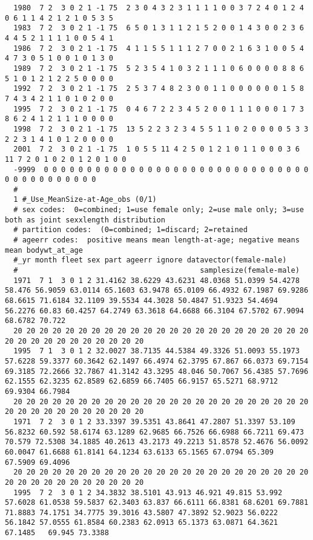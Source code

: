 \begin{landscape}
{\begin{verbatim}
  1980  7 2  3 0 2 1 -1 75  2 3 0 4 3 2 3 1 1 1 1 0 0 3 7 2 4 0 1 2 4 0 6 1 1 4 2 1 2 1 0 5 3 5
  1983  7 2  3 0 2 1 -1 75  6 5 0 1 3 1 1 2 1 5 2 0 0 1 4 3 0 0 2 3 6 4 4 5 2 1 1 1 1 0 0 5 4 1
  1986  7 2  3 0 2 1 -1 75  4 1 1 5 5 1 1 1 2 7 0 0 2 1 6 3 1 0 0 5 4 4 7 3 0 5 1 0 0 1 0 1 3 0
  1989  7 2  3 0 2 1 -1 75  5 2 3 5 4 1 0 3 2 1 1 1 0 6 0 0 0 0 8 8 6 5 1 0 1 2 1 2 2 5 0 0 0 0
  1992  7 2  3 0 2 1 -1 75  2 5 3 7 4 8 2 3 0 0 1 1 0 0 0 0 0 0 1 5 8 7 4 3 4 2 1 1 0 1 0 2 0 0
  1995  7 2  3 0 2 1 -1 75  0 4 6 7 2 2 3 4 5 2 0 0 1 1 1 0 0 0 1 7 3 8 6 2 4 1 2 1 1 1 0 0 0 0
  1998  7 2  3 0 2 1 -1 75  13 5 2 2 3 2 3 4 5 5 1 1 0 2 0 0 0 0 5 3 3 2 2 3 1 4 1 0 1 2 0 0 0 0
  2001  7 2  3 0 2 1 -1 75  1 0 5 5 11 4 2 5 0 1 2 1 0 1 1 0 0 0 3 6 11 7 2 0 1 0 2 0 1 2 0 1 0 0
  -9999  0 0 0 0 0 0 0 0 0 0 0 0 0 0 0 0 0 0 0 0 0 0 0 0 0 0 0 0 0 0 0 0 0 0 0 0 0 0 0 0 0 0
  #
  1 #_Use_MeanSize-at-Age_obs (0/1)
  # sex codes:  0=combined; 1=use female only; 2=use male only; 3=use both as joint sexxlength distribution
  # partition codes:  (0=combined; 1=discard; 2=retained
  # ageerr codes:  positive means mean length-at-age; negative means mean bodywt_at_age
  #_yr month fleet sex part ageerr ignore datavector(female-male)
  #                                          samplesize(female-male)
  1971  7 1  3 0 1 2 31.4162 38.6229 43.6231 48.0368 51.0399 54.4278 58.476 56.9059 63.0114 65.1603 63.9478 65.0109 66.4932 67.1987 69.9286 68.6615 71.6184 32.1109 39.5534 44.3028 50.4847 51.9323 54.4694 56.2276 60.83 60.4257 64.2749 63.3618 64.6688 66.3104 67.5702 67.9094   68.6782 70.722
  20 20 20 20 20 20 20 20 20 20 20 20 20 20 20 20 20 20 20 20 20 20 20 20 20 20 20 20 20 20 20 20 20 20
  1995  7 1  3 0 1 2 32.0027 38.7135 44.5384 49.3326 51.0093 55.1973 57.6228 59.3377 60.3642 62.1497 66.4974 62.3795 67.867 66.0373 69.7154 69.3185 72.2666 32.7867 41.3142 43.3295 48.046 50.7067 56.4385 57.7696 62.1555 62.3235 62.8589 62.6859 66.7405 66.9157 65.5271 68.9712  69.9304 66.7984
  20 20 20 20 20 20 20 20 20 20 20 20 20 20 20 20 20 20 20 20 20 20 20 20 20 20 20 20 20 20 20 20 20 20
  1971  7 2  3 0 1 2 33.3397 39.5351 43.8641 47.2807 51.3397 53.109 56.8232 60.592 58.6174 63.1289 62.9685 66.7526 66.6988 66.7211 69.473 70.579 72.5308 34.1885 40.2613 43.2173 49.2213 51.8578 52.4676 56.0092 60.0047 61.6688 61.8141 64.1234 63.6133 65.1565 67.0794 65.309   67.5909 69.4096
  20 20 20 20 20 20 20 20 20 20 20 20 20 20 20 20 20 20 20 20 20 20 20 20 20 20 20 20 20 20 20 20 20 20
  1995  7 2  3 0 1 2 34.3832 38.5101 43.913 46.921 49.815 53.992 57.6028 61.0538 59.5837 62.3403 63.837 66.6111 66.8381 68.6201 69.7881 71.8883 74.1751 34.7775 39.3016 43.5807 47.3892 52.9023 56.0222 56.1842 57.0555 61.8584 60.2383 62.0913 65.1373 63.0871 64.3621 67.1485   69.945 73.3388

\end{verbatim}}
\end{landscape}
